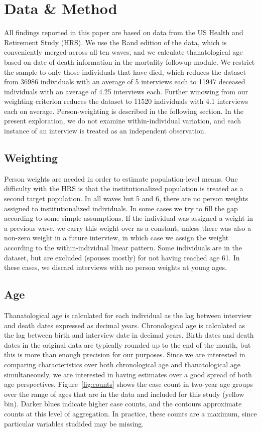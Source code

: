 \documentclass{article}
\begin{document}
\section{Data \& Method}
All findings reported in this paper are based on data from the US Health and
Retirement Study (HRS). We use the Rand edition of the data, which is
conveniently merged across all ten waves, and we calculate thanatological age
based on date of death information in the mortality followup module. We
restrict the sample to only those individuals that have died, which reduces the
dataset from 36986 individuals with an average of 5 interviews each to 11947
deceased individuals with an average of 4.25 interviews each. Further winowing
from our weighting criterion reduces the dataset to
11520 individuals with 4.1 interviews each on average. Person-weighting is
described in the following section. In the present exploration, we do not examine
within-individual variation, and each instance of an interview is treated as an
independent observation.

\subsection{Weighting}
Person weights
are needed in order to estimate population-level means.
One difficulty with the HRS is that the institutionalized population is treated
as a second target population. In all waves but 5 and 6, there are no person weights
assigned to institutionalized individuals. In some cases we try to fill the gap according to some simple
assumptions. If the individual was assigned a weight in a previous wave, we
carry this weight over as a constant, unless there was also a non-zero weight in a future interview, in
which case we assign the weight according to the within-individual linear
pattern. Some individuals are in the dataset, but are
excluded (spouses mostly) for not having reached age 61. In these
cases, we discard interviews with no person weights at young ages. 

\subsection{Age}
Thanatological age is calculated for each individual as the lag between
interview and death dates expressed as decimal years. Chronological age is
calculated as the lag between birth and interview date in decimal years. Birth
dates and death dates in the original data are typically rounded up to the end
of the month, but this is more than enough precision for our purposes. Since we
are interested in comparing characteristics over both chronological age and
thanatological age simultaneously, we are interested in having estimates over a
good spread of both age perspectives.
Figure~\ref{fig:counts} shows the case count in two-year age groups over the
range of ages that are in the data and included for this study (yellow bin).
Darker blues indicate higher case counts, and the contours approximate counts at
this level of aggregation. In practice, these counts are a maximum, since
particular variables studided may be missing.
\end{document}
